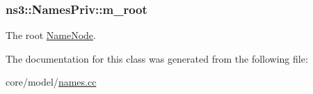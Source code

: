 \subsubsection[{\texorpdfstring{m\+\_\+root}{m_root}}]{ ns3\+::\+Names\+Priv\+::m\+\_\+root\hspace{0.3cm}{\ttfamily [private]}}\hypertarget{classns3_1_1NamesPriv_a24851b2ca8230416228472b2e4e1b587}{}\label{classns3_1_1NamesPriv_a24851b2ca8230416228472b2e4e1b587}
The root \hyperlink{classns3_1_1NameNode}{Name\+Node}. 

The documentation for this class was generated from the following file\+:\begin{DoxyCompactItemize}
\item 
core/model/\hyperlink{names_8cc}{names.\+cc}\end{DoxyCompactItemize}
